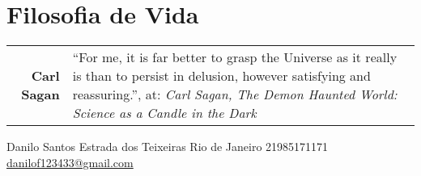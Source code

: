 \documentclass[Personalized]{simplehipstercv}
\newlength{\rightcolwidth}
\begin{document}
\begin{paracol}{2}
\begin{minipage}[t]{0.3\textwidth}
\begin{tabular}{l | ll}
\end{tabular}


\end{minipage}\hfill
\begin{minipage}[t]{0.3\textwidth}


\section*{Filosofia de Vida}
\begin{tabular}{>{\footnotesize\bfseries}r >{\footnotesize}p{}}
    Carl Sagan & ``For me, it is far better to grasp the Universe as it really is than to persist in delusion, however satisfying and reassuring.'', at: \emph{Carl Sagan, The Demon Haunted World: Science as a Candle in the Dark}
\end{tabular}
\end{minipage}

\bigskip






\vfill{} %

\setlength{\parindent}{0pt}
\begin{minipage}[t]{\rightcolwidth}
\begin{center}\fontfamily{\sfdefault}\selectfont \color{black!70}
{\small Danilo Santos  Estrada dos Teixeiras  Rio de Janeiro  21985171171 \newline{} \protect\url{danilof123433@gmail.com}
}
\end{center}
\end{minipage}

\end{paracol}
\end{document}
